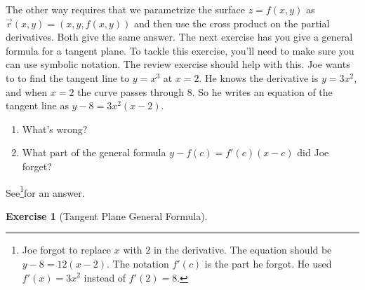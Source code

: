 \documentclass[10pt,]{book}
\theoremstyle{plain}
\theoremstyle{definition}
\theoremstyle{definition}
\theoremstyle{definition}
\theoremstyle{definition}
\newtheorem{exploration}[project]{Exercise}
\theoremstyle{definition}
\numberwithin{equation}{section}
\begin{document}
\par
The other way requires that we parametrize the surface \(z=f(x,y)\) as \(\vec r(x,y)=(x,y,f(x,y))\) and then use the cross product on the partial derivatives. Both give the same answer. The next exercise has you give a general formula for a tangent plane. To tackle this exercise, you'll need to make sure you can use symbolic notation. The review exercise should help with this.%
Joe wants to to find the tangent line to \(y=x^3\) at \(x=2\). He knows the derivative is \(y=3x^2\), and when \(x=2\) the curve passes through \(8\). So he writes an equation of the tangent line as \(y-8=3x^2(x-2)\). \leavevmode%
\begin{enumerate}
\item\hypertarget{li-82}{}What's wrong?%
\item\hypertarget{li-83}{}What part of the general formula \(y-f(c) = f'(c) (x-c)\) did Joe forget?%
\end{enumerate}
%
 \par
See\footnote{Joe forgot to replace \(x\) with \(2\) in the derivative. The equation should be \(y-8=12(x-2)\).  The notation \(f'(c)\) is the part he forgot.  He used \(f'(x)=3x^2\) instead of \(f'(2)=8\).\label{fn-3}}for an answer.%
\begin{exploration}[Tangent Plane General Formula]\label{exploration-147}
\end{exploration}
\typeout{************************************************}
\typeout{************************************************}
\end{document}
